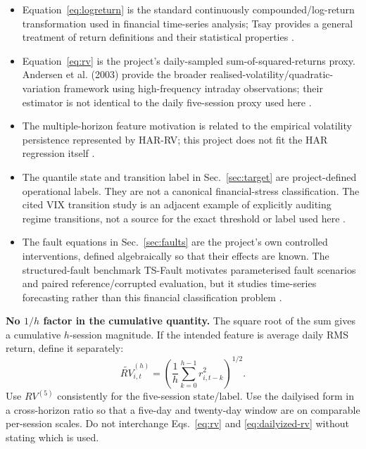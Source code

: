 \documentclass[11pt,a4paper]{article}
\begin{document}
\begin{itemize}
  \item Equation~\eqref{eq:logreturn} is the standard continuously compounded/log-return transformation used in financial time-series analysis; Tsay provides a general treatment of return definitions and their statistical properties \cite{Tsay2010}.
  \item Equation~\eqref{eq:rv} is the project's daily-sampled sum-of-squared-returns proxy. Andersen et al. (2003) provide the broader realised-volatility/quadratic-variation framework using high-frequency intraday observations; their estimator is not identical to the daily five-session proxy used here \cite{Andersen2003}.
  \item The multiple-horizon feature motivation is related to the empirical volatility persistence represented by HAR-RV; this project does not fit the HAR regression itself \cite{Corsi2009}.
  \item The quantile state and transition label in Sec.~\ref{sec:target} are project-defined operational labels. They are not a canonical financial-stress classification. The cited VIX transition study is an adjacent example of explicitly auditing regime transitions, not a source for the exact threshold or label used here \cite{GuptaLiu2026}.
  \item The fault equations in Sec.~\ref{sec:faults} are the project's own controlled interventions, defined algebraically so that their effects are known. The structured-fault benchmark TS-Fault motivates parameterised fault scenarios and paired reference/corrupted evaluation, but it studies time-series forecasting rather than this financial classification problem \cite{Zhao2026TSFault}.
\end{itemize}

\textbf{No $1/h$ factor in the cumulative quantity.} The square root of the sum gives a cumulative $h$-session magnitude. If the intended feature is average daily RMS return, define it separately:
\begin{equation}
  \widetilde{RV}_{i,t}^{(h)}=
  \left(\frac{1}{h}\sum_{k=0}^{h-1}r_{i,t-k}^{2}\right)^{1/2}.
  \label{eq:dailyized-rv}
\end{equation}
Use $RV^{(5)}$ consistently for the five-session state/label. Use the dailyised form in a cross-horizon ratio so that a five-day and twenty-day window are on comparable per-session scales. Do not interchange Eqs.~\eqref{eq:rv} and \eqref{eq:dailyized-rv} without stating which is used.
\end{document}
